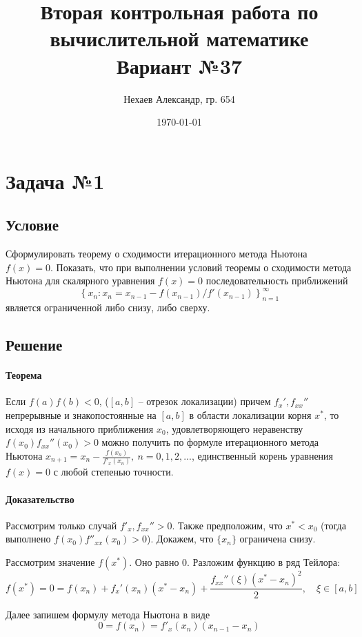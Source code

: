 \documentclass[a4paper, 12pt]{article}
\title{Вторая контрольная работа по вычислительной математике\\
Вариант №37}
\author{Нехаев Александр, гр. 654}
\date{\today}
\begin{document}
	\maketitle
	\section*{Задача №1}
	\subsection*{Условие}
	Сформулировать теорему о сходимости итерационного метода Ньютона $f(x)=0$. Показать, что при выполнении условий теоремы о сходимости метода Ньютона для скалярного уравнения $f(x)=0$ последовательность приближений 
\begin{equation*}
\left\lbrace x_n:x_n=x_{n-1}-f\left(x_{n-1}\right)/f'\left(x_{n-1}\right)\right\rbrace^\infty_{n=1}
\end{equation*}	
является ограниченной либо снизу, либо сверху.
	\subsection*{Решение}
	\paragraph{Теорема}Если $f(a)f(b)<0$, ($[a,b]$ -- отрезок локализации) причем $f_x',f_{xx}''$ непрерывные и знакопостоянные на $[a,b]$ в области локализации корня $x^*$, то исходя из начального приближения $x_0$, удовлетворяющего неравенству $f(x_0)f_{xx}''(x_0)>0$ можно получить по формуле итерационного метода Ньютона $x_{n+1}=x_n-\frac{f(x_n)}{f'_x(x_n)},\ n=0,1,2,...$, единственный корень уравнения $f(x)=0$ с любой степенью точности.
	\paragraph{Доказательство}Рассмотрим только случай $f'_x,f_{xx}''>0$. Также предположим, что $x^*<x_0$ (тогда выполнено $f(x_0)f''_{xx}(x_0)>0$). Докажем, что $\{x_n\}$ ограничена снизу.\par
	Рассмотрим значение $f(x^*)$. Оно равно 0. Разложим функцию в ряд Тейлора:
	\begin{equation*}
		f(x^*)=0=f(x_n)+f_x'(x_n)(x^*-x_n)+\frac{f_{xx}''(\xi)(x^*-x_n)^2}{2},\quad\xi\in[a,b]
	\end{equation*}
	
	Далее запишем формулу метода Ньютона в виде
	\begin{equation*}
		0=f(x_n)=f'_x(x_n)(x_{n-1}-x_n)
	\end{equation*}
	
\end{document}
